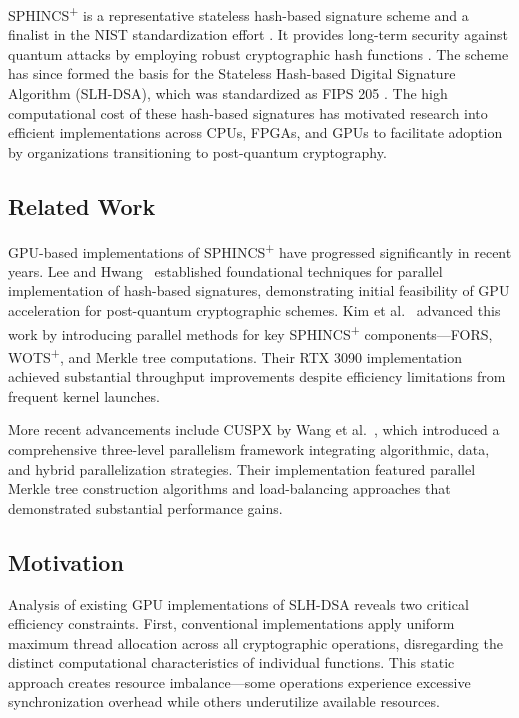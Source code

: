 \documentclass[journal]{IEEEtran}
\begin{document}
SPHINCS\textsuperscript{+} is a representative stateless hash-based signature scheme and a finalist in the NIST standardization effort \cite{Turan}. It provides long-term security against quantum attacks by employing robust cryptographic hash functions \cite{Bernstein2019}. The scheme has since formed the basis for the Stateless Hash-based Digital Signature Algorithm (SLH-DSA), which was standardized as FIPS 205 \cite{FIPS205}. The high computational cost of these hash-based signatures has motivated research into efficient implementations across CPUs, FPGAs, and GPUs \cite{Joseph2022} to facilitate adoption by organizations transitioning to post-quantum cryptography.

\subsection{Related Work}

GPU-based implementations of SPHINCS\textsuperscript{+} have progressed significantly in recent years. Lee and Hwang~\cite{Lee2022} established foundational techniques for parallel implementation of hash-based signatures, demonstrating initial feasibility of GPU acceleration for post-quantum cryptographic schemes. Kim et al.~\cite{Kim2024} advanced this work by introducing parallel methods for key SPHINCS\textsuperscript{+} components—FORS, WOTS\textsuperscript{+}, and Merkle tree computations. Their RTX 3090 implementation achieved substantial throughput improvements despite efficiency limitations from frequent kernel launches.

More recent advancements include CUSPX by Wang et al.~\cite{Wang2025}, which introduced a comprehensive three-level parallelism framework integrating algorithmic, data, and hybrid parallelization strategies. Their implementation featured parallel Merkle tree construction algorithms and load-balancing approaches that demonstrated substantial performance gains.

\subsection{Motivation}

Analysis of existing GPU implementations of SLH-DSA reveals two critical efficiency constraints. First, conventional implementations apply uniform maximum thread allocation across all cryptographic operations, disregarding the distinct computational characteristics of individual functions. This static approach creates resource imbalance—some operations experience excessive synchronization overhead while others underutilize available resources.
\end{document}
